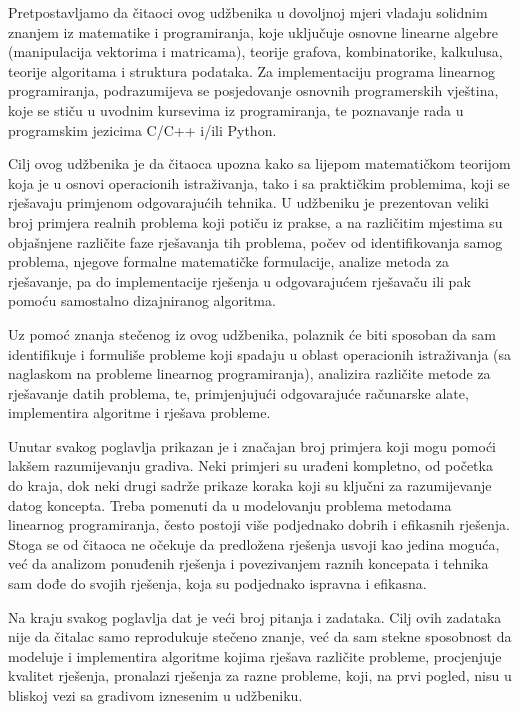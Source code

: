 \documentclass[a4paper, utf8, 11pt, colorlinks]{book}
\theoremstyle{definition}
\begin{document}
Pretpostavljamo da čitaoci ovog udžbenika u dovoljnoj mjeri vladaju solidnim znanjem iz matematike i programiranja, koje uključuje osnovne linearne algebre (manipulacija vektorima i matricama), teorije grafova, kombinatorike, kalkulusa, teorije algoritama i struktura podataka. Za implementaciju programa linearnog programiranja, podrazumijeva se posjedovanje osnovnih programerskih vještina, koje se stiču u uvodnim kursevima iz programiranja, te poznavanje rada u  programskim jezicima C/C++ i/ili Python. 

Cilj ovog udžbenika je da čitaoca upozna kako sa lijepom matematičkom teorijom koja je u osnovi operacionih istraživanja, tako i sa praktičkim problemima, koji se rješavaju primjenom odgovarajućih tehnika. U udžbeniku je prezentovan veliki broj primjera realnih problema koji potiču iz prakse, a na različitim mjestima su objašnjene različite faze rješavanja tih problema, počev od  identifikovanja samog problema, njegove formalne matematičke formulacije, analize  metoda za rješavanje, pa do implementacije rješenja u odgovarajućem rješavaču ili pak pomoću samostalno dizajniranog algoritma. 


Uz pomoć znanja stečenog iz ovog udžbenika, polaznik će biti sposoban da sam identifikuje i formuliše probleme koji spadaju u oblast operacionih istraživanja (sa naglaskom na probleme linearnog programiranja), analizira različite metode za rješavanje datih problema, te, primjenjujući odgovarajuće računarske alate, implementira algoritme i rješava probleme.

Unutar svakog poglavlja prikazan je i značajan broj primjera koji mogu pomoći lakšem razumijevanju gradiva. Neki primjeri su urađeni kompletno, od početka do kraja, dok neki drugi sadrže prikaze koraka koji su klju\v cni za razumijevanje datog koncepta. Treba pomenuti da u modelovanju problema metodama linearnog programiranja, često postoji više podjednako dobrih i efikasnih rješenja. Stoga se od čitaoca ne očekuje da predložena rješenja usvoji kao jedina moguća, već da analizom ponuđenih rješenja i povezivanjem raznih koncepata i tehnika sam dođe do svojih rješenja, koja su podjednako ispravna i efikasna.

Na kraju svakog poglavlja dat je veći broj pitanja i zadataka. Cilj ovih zadataka nije da čitalac samo reprodukuje stečeno znanje, već da sam stekne sposobnost da modeluje i implementira algoritme kojima rješava različite probleme, procjenjuje kvalitet rješenja, pronalazi rješenja za razne probleme, koji, na prvi pogled, nisu u bliskoj vezi sa gradivom iznesenim u udžbeniku.
\end{document}
